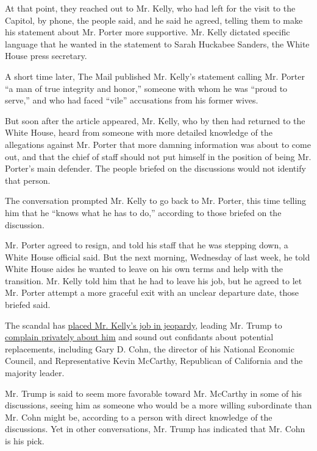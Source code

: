 At that point, they reached out to Mr. Kelly, who had left for the visit
to the Capitol, by phone, the people said, and he said he agreed,
telling them to make his statement about Mr. Porter more supportive. Mr.
Kelly dictated specific language that he wanted in the statement to
Sarah Huckabee Sanders, the White House press secretary.

A short time later, The Mail published Mr. Kelly's statement calling Mr.
Porter ``a man of true integrity and honor,'' someone with whom he was
``proud to serve,'' and who had faced ``vile'' accusations from his
former wives.

But soon after the article appeared, Mr. Kelly, who by then had returned
to the White House, heard from someone with more detailed knowledge of
the allegations against Mr. Porter that more damning information was
about to come out, and that the chief of staff should not put himself in
the position of being Mr. Porter's main defender. The people briefed on
the discussions would not identify that person.

The conversation prompted Mr. Kelly to go back to Mr. Porter, this time
telling him that he ``knows what he has to do,'' according to those
briefed on the discussion.

Mr. Porter agreed to resign, and told his staff that he was stepping
down, a White House official said. But the next morning, Wednesday of
last week, he told White House aides he wanted to leave on his own terms
and help with the transition. Mr. Kelly told him that he had to leave
his job, but he agreed to let Mr. Porter attempt a more graceful exit
with an unclear departure date, those briefed said.

The scandal has
\href{https://www.nytimes3xbfgragh.onion/2018/02/09/us/politics/trump-porter-abuse.html}{placed
Mr. Kelly's job in jeopardy}, leading Mr. Trump to
\href{https://www.nytimes3xbfgragh.onion/2018/02/08/us/politics/kelly-trump.html}{complain
privately about him} and sound out confidants about potential
replacements, including Gary D. Cohn, the director of his National
Economic Council, and Representative Kevin McCarthy, Republican of
California and the majority leader.

Mr. Trump is said to seem more favorable toward Mr. McCarthy in some of
his discussions, seeing him as someone who would be a more willing
subordinate than Mr. Cohn might be, according to a person with direct
knowledge of the discussions. Yet in other conversations, Mr. Trump has
indicated that Mr. Cohn is his pick.

